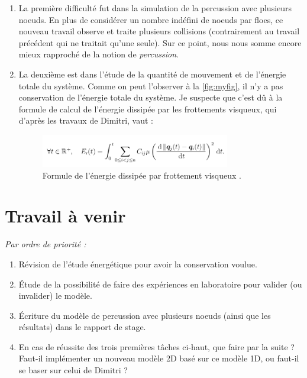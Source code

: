 \documentclass[
  french,
	11pt, %
]{fphw}
\begin{document}
\begin{enumerate}
  \item La première difficulté fut dans la simulation de la percussion avec plusieurs noeuds. En plus de considérer un nombre indéfini de noeuds par floes, ce nouveau travail observe et traite plusieurs collisions (contrairement au travail précédent qui ne traitait qu'une seule). Sur ce point, nous nous somme encore mieux rapproché de la notion de \emph{percussion}. 
  \item La deuxième est dans l'étude de la quantité de mouvement et de l'énergie totale du système. Comme on peut l'observer à la \cref{fig:myfig}, il n'y a pas conservation de l'énergie totale du système. Je suspecte que c'est dû à la formule de calcul de l'énergie dissipée par les frottements visqueux, qui d'après les travaux de Dimitri, vaut :
  \begin{figure}[H]
    \centering
    \includegraphics[width=0.78\textwidth]{EnergieDissipee.png}
    \caption{Formule de l'énergie dissipée par frottement visqueux \parencite[p.188]{balasoiu2020halthesis}.}
    \label{fig:myfig2}
  \end{figure}
\end{enumerate}



\section*{Travail à venir}

\emph{Par ordre de priorité :}

\begin{enumerate}
  \item Révision de l'étude énergétique pour avoir la conservation voulue.
  \item Étude de la possibilité de faire des expériences en laboratoire pour valider (ou invalider) le modèle.
  \item Écriture du modèle de percussion avec plusieurs noeuds (ainsi que les résultats) dans le rapport de stage.
  \item En cas de réussite des trois premières tâches ci-haut, que faire par la suite ? Faut-il implémenter un nouveau modèle 2D basé sur ce modèle 1D, ou faut-il se baser sur celui de Dimitri ?
\end{enumerate}



 
\clearpage   %
\printbibliography
\end{document}
